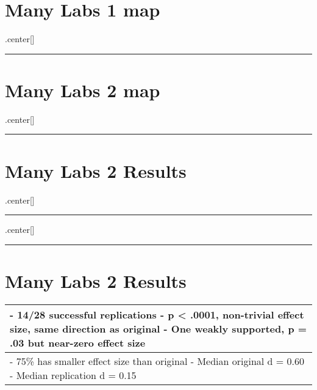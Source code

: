 \documentclass[]{article}
\begin{document}
\section{Many Labs 1 map}\label{many-labs-1-map}

.center{[}{]}

\begin{center}\rule{0.5\linewidth}{\linethickness}\end{center}

\section{Many Labs 2 map}\label{many-labs-2-map}

.center{[}{]}

\begin{center}\rule{0.5\linewidth}{\linethickness}\end{center}

\section{Many Labs 2 Results}\label{many-labs-2-results}

.center{[}{]}

\begin{center}\rule{0.5\linewidth}{\linethickness}\end{center}

.center{[}{]}

\begin{center}\rule{0.5\linewidth}{\linethickness}\end{center}

\section{Many Labs 2 Results}\label{many-labs-2-results-1}

\begin{longtable}[]{@{}l@{}}
\toprule
\begin{minipage}[b]{0.03\columnwidth}\raggedright\strut
- 14/28 successful replications - p \textless{} .0001, non-trivial
effect size, same direction as original - One weakly supported, p = .03
but near-zero effect size\strut
\end{minipage}\tabularnewline
\midrule
\endhead
\begin{minipage}[t]{0.03\columnwidth}\raggedright\strut
- 75\% has smaller effect size than original - Median original d = 0.60
- Median replication d = 0.15\strut
\end{minipage}\tabularnewline
\bottomrule
\end{longtable}
\end{document}
